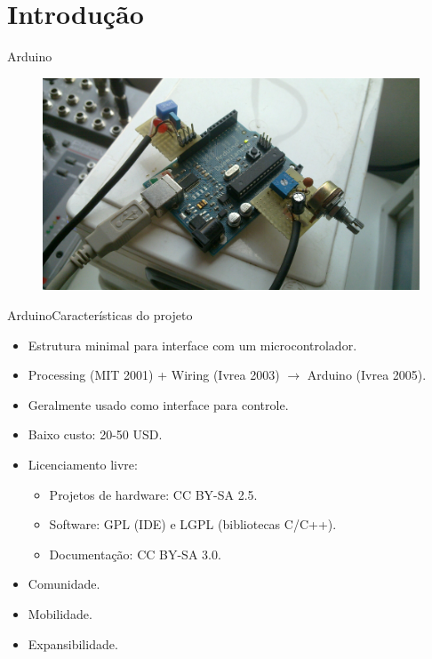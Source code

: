 \section{Introdução}


\begin{frame}{Arduino}
\begin{figure}
\includegraphics[width=\textwidth]{./img/arduino.png}
\end{figure}
\end{frame}


\begin{frame}{Arduino}{Características do projeto}
  \begin{itemize}
    \item Estrutura minimal para interface com um microcontrolador.
    \item Processing (MIT 2001) + Wiring (Ivrea 2003) $\rightarrow$ Arduino
    (Ivrea 2005).
    \item Geralmente usado como interface para controle.
    \item Baixo custo: 20-50 USD.
    \item Licenciamento livre:
    \begin{itemize}
      \item Projetos de hardware: CC BY-SA 2.5.
      \item Software: GPL (IDE) e LGPL (bibliotecas C/C++).
      \item Documentação: CC BY-SA 3.0.
    \end{itemize}
    \item Comunidade.
    \item Mobilidade.
    \item Expansibilidade.
  \end{itemize}
\end{frame}

